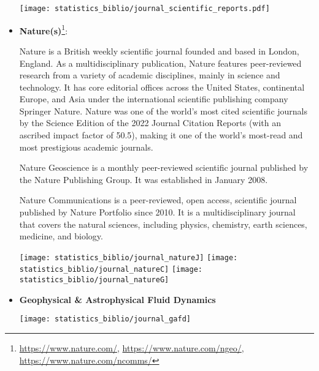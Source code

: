 \begin{itemize}
\begin{center}
\texttt{[image: statistics\_biblio/journal\_scientific\_reports.pdf]}
\end{center}

\item {\bf Nature(s)}\footnote{
\url{https://www.nature.com/},
\url{https://www.nature.com/ngeo/},
\url{https://www.nature.com/ncomms/}
}:

Nature is a British weekly scientific journal founded and based in London, England. 
As a multidisciplinary publication, Nature features peer-reviewed research from a variety of 
academic disciplines, mainly in science and technology. It has core editorial offices across the 
United States, continental Europe, and Asia under the international scientific publishing company 
Springer Nature. Nature was one of the world's most cited scientific journals by the Science Edition 
of the 2022 Journal Citation Reports (with an ascribed impact factor of 50.5), making it one of the world's most-read and most prestigious academic journals.

Nature Geoscience is a monthly peer-reviewed scientific journal published by the Nature Publishing Group. 
It was established in January 2008. 

Nature Communications is a peer-reviewed, open access, scientific journal published by Nature Portfolio since 2010. 
It is a multidisciplinary journal that covers the natural sciences, including physics, chemistry, earth sciences, 
medicine, and biology.

\begin{center}
\texttt{[image: statistics\_biblio/journal\_natureJ]}
\texttt{[image: statistics\_biblio/journal\_natureC]}
\texttt{[image: statistics\_biblio/journal\_natureG]}
\end{center}

\item {\bf Geophysical \& Astrophysical Fluid Dynamics} 

\begin{center}
\texttt{[image: statistics\_biblio/journal\_gafd]}
\end{center}




\end{itemize}




